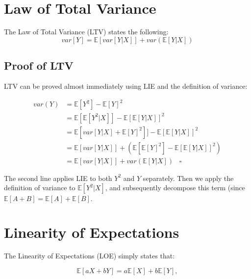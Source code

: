 \documentclass[
]{book}
\begin{document}
\hypertarget{law-of-total-variance}{%
\section{Law of Total Variance}\label{law-of-total-variance}}

The Law of Total Variance (LTV) states the following:
\begin{equation}
    var[Y] = \mathbb{E}[var[Y|X]] + var(\mathbb{E}[Y|X])
\end{equation}

\hypertarget{proof-of-ltv}{%
\subsection{Proof of LTV}\label{proof-of-ltv}}

LTV can be proved almost immediately using LIE and the definition of variance:

\begin{align}
    var(Y) &= \mathbb{E}[Y^2] - \mathbb{E}[Y]^2 \label{eq:var_def} \\ 
           &= \mathbb{E}[\mathbb{E}[Y^2|X]] - \mathbb{E}[\mathbb{E}[Y|X]]^2 \label{eq:var_lie} \\ 
           &= \mathbb{E}[var[Y|X] + \mathbb{E}[Y]^2]] - \mathbb{E}[\mathbb{E}[Y|X]]^2 \label{eq:var_by10}\\
           &= \mathbb{E}[var[Y|X]] + (\mathbb{E}[\mathbb{E}[Y]^2] - \mathbb{E}[\mathbb{E}[Y|X]]^2) \label{eq:var_eshift}\\
           &= \mathbb{E}[var[Y|X]] + var(\mathbb{E}[Y|X]) \label{eq:var_by10_2} \; \; \; \square
\end{align}

The second line applies LIE to both \(Y^2\) and \(Y\) separately. Then we apply the definition of variance to \(\mathbb{E}[Y^2|X]\), and subsequently decompose this term (since \(\mathbb{E}[A+B] = \mathbb{E}[A] + \mathbb{E}[B]\).

\hypertarget{linearity-of-expectations}{%
\section{Linearity of Expectations}\label{linearity-of-expectations}}

The Linearity of Expectations (LOE) simply states that:

\begin{equation}
    \mathbb{E}[aX + bY] = a\mathbb{E}[X] + b\mathbb{E}[Y],
\end{equation}
\end{document}
